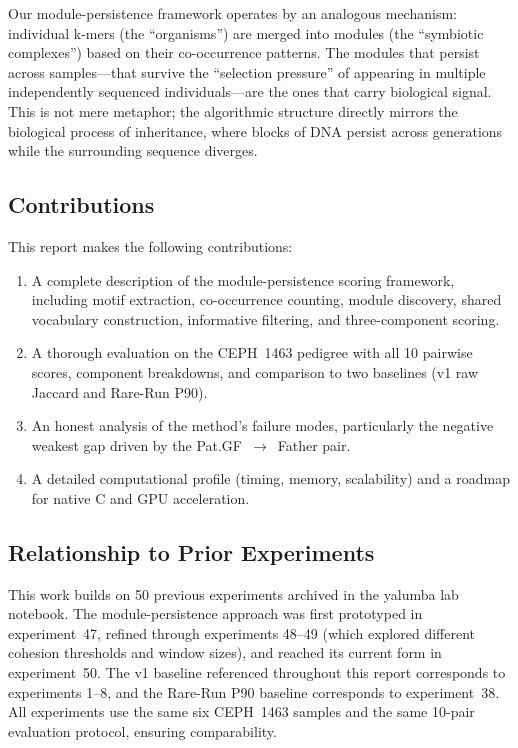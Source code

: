 \documentclass{../yalumba}
\begin{document}
Our module-persistence framework operates by an analogous mechanism: individual
k-mers (the ``organisms'') are merged into modules (the ``symbiotic
complexes'') based on their co-occurrence patterns.  The modules that persist
across samples---that survive the ``selection pressure'' of appearing in
multiple independently sequenced individuals---are the ones that carry
biological signal.  This is not mere metaphor; the algorithmic structure
directly mirrors the biological process of inheritance, where blocks of DNA
persist across generations while the surrounding sequence diverges.

\subsection{Contributions}

This report makes the following contributions:

\begin{enumerate}
  \item A complete description of the module-persistence scoring framework,
        including motif extraction, co-occurrence counting, module discovery,
        shared vocabulary construction, informative filtering, and
        three-component scoring.
  \item A thorough evaluation on the CEPH~1463 pedigree with all 10 pairwise
        scores, component breakdowns, and comparison to two baselines (v1 raw
        Jaccard and Rare-Run P90).
  \item An honest analysis of the method's failure modes, particularly the
        negative weakest gap driven by the Pat.GF~$\to$~Father pair.
  \item A detailed computational profile (timing, memory, scalability) and a
        roadmap for native C and GPU acceleration.
\end{enumerate}

\subsection{Relationship to Prior Experiments}

This work builds on 50 previous experiments archived in the yalumba lab notebook.
The module-persistence approach was first prototyped in experiment~47, refined
through experiments 48--49 (which explored different cohesion thresholds and
window sizes), and reached its current form in experiment~50.  The v1 baseline
referenced throughout this report corresponds to experiments 1--8, and the
Rare-Run P90 baseline corresponds to experiment~38.  All experiments use the same
six CEPH~1463 samples and the same 10-pair evaluation protocol, ensuring
comparability.
\end{document}
